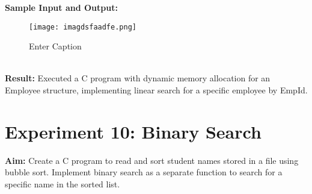 \documentclass{article}
\begin{document}
\textbf{Sample Input and Output:}
\begin{figure}[h]
    \centering
    \texttt{[image: imagdsfaadfe.png]}
    \caption{Enter Caption}
    \label{fig:enter-label}
\end{figure}
\\
\textbf{Result:} Executed a C program with dynamic memory allocation for an Employee structure, implementing linear search for a specific employee by EmpId.

\clearpage
\section{Experiment 10: Binary Search}
\textbf{Aim:} Create a C program to read and sort student names stored in a file using bubble sort. Implement binary search as a separate function to search for a specific name in the sorted list.
\end{document}
